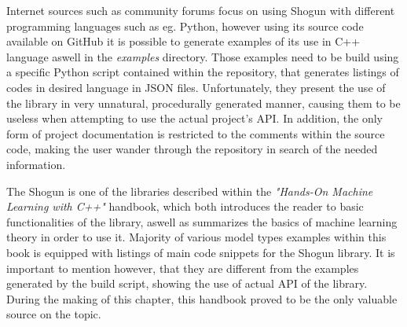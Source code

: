 Internet sources such as community forums focus on using Shogun with different programming languages such as eg. Python, however using its source code available on GitHub \cite{shogun:github} it is possible to generate examples of its use in C++ language aswell in the \textit{examples} directory. Those examples need to be build using a specific Python script contained within the repository, that generates listings of codes in desired language in JSON files. Unfortunately, they present the use of the library in very unnatural, procedurally generated manner, causing them to be useless when attempting to use the actual project's API. In addition, the only form of project documentation is restricted to the comments within the source code, making the user wander through the repository in search of the needed information.

The Shogun is one of the libraries described within the \textit{"Hands-On Machine Learning with C++"}\cite{handsOnMachineLearning} handbook, which both introduces the reader to basic functionalities of the library, aswell as summarizes the basics of machine learning theory in order to use it. Majority of various model types examples within this book is equipped with listings of main code snippets for the Shogun library. It is important to mention however, that they are different from the examples generated by the build script, showing the use of actual API of the library. During the making of this chapter, this handbook proved to be the only valuable source on the topic.